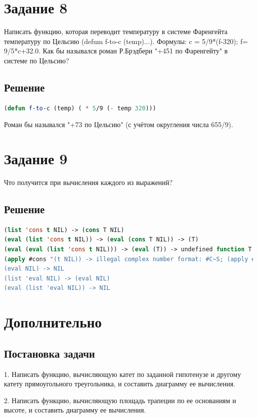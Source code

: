 \documentclass[12pt]{report}
\begin{document}
\section*{Задание 8}
Написать функцию, которая переводит температуру в системе Фаренгейта температуру по Цельсию (defum f-to-c (temp)...).
Формулы: c = 5/9*(f-320); f= 9/5*c+32.0.
Как бы назывался роман Р.Брэдбери "+451 по Фаренгейту" в системе по Цельсию?

\subsection*{Решение}
\begin{lstlisting}[label=8xd,caption=Решение задания №8, language=lisp]
(defun f-to-c (temp) ( * 5/9 (- temp 320)))
\end{lstlisting}

Роман бы назывался "+73 по Цельсию" (с учётом округления числа 655/9).

\section*{Задание 9}
Что получится при вычисления каждого из выражений?

\subsection*{Решение}
\begin{lstlisting}[label=9xd,caption=Решение задания №9, language=lisp]
(list 'cons t NIL) -> (cons T NIL)
(eval (list 'cons t NIL)) -> (eval (cons T NIL)) -> (T)
(eval (eval (list 'cons t NIL))) -> (eval (T)) -> undefined function T
(apply #cons "(t NIL)) -> illegal complex number format: #C~S; (apply #'cons '(t NIL)) -> (T)
(eval NIL) -> NIL
(list 'eval NIL) -> (eval NIL)
(eval (list 'eval NIL)) -> NIL
\end{lstlisting}

\section*{Дополнительно}
\subsection*{Постановка задачи}
1. Написать функцию, вычисляющую катет по заданной гипотенузе и другому катету прямоугольного треугольника, и составить диаграмму ее вычисления.

2. Написать функцию, вычисляющую площадь трапеции по ее основаниям и
высоте, и составить диаграмму ее вычисления.
\end{document}
